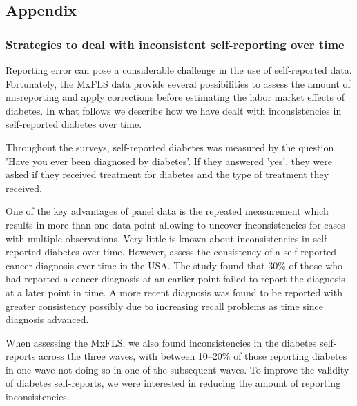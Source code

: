 \documentclass[12pt,english]{article}
\providecommand{\DIFaddbegin}{} %
\providecommand{\DIFaddend}{} %
\providecommand{\DIFdelend}{} %
\begin{document}
\DIFdelend \clearpage
\DIFaddbegin \begin{appendix}
\DIFaddend 



\part*{\label{part:Appendix}Appendix}

\section{\label{sec:Appendix}Strategies to deal with inconsistent self-reporting over time}

Reporting error can pose a considerable challenge in the use of self-reported data. Fortunately, the \ac{MxFLS} data provide several possibilities to assess the amount of misreporting and apply corrections before estimating the labor market effects of diabetes. In what follows we describe how we have dealt with inconsistencies in self-reported diabetes over time.

Throughout the surveys, self-reported diabetes was measured by the question 'Have you ever been diagnosed by diabetes'. If they answered 'yes', they were asked if they received treatment for diabetes and the type of treatment they received.

One of the key advantages of panel data is the repeated measurement which results in more than one data point allowing to uncover inconsistencies for cases with multiple observations. Very little is known about inconsistencies in self-reported diabetes over time. However, \textcite{Zajacova2010} assess the consistency of a self-reported cancer diagnosis over time in the USA. The study found that 30\% of those who had reported a cancer diagnosis at an earlier point failed to report the diagnosis at a later point in time. A more recent diagnosis was found to be reported with greater consistency possibly due to increasing recall problems as time since diagnosis advanced.

When assessing the \ac{MxFLS}, we also found inconsistencies in the diabetes self-reports across the three waves, with between 10--20\% of those reporting diabetes in one wave not doing so in one of the subsequent waves. To improve the validity of diabetes self-reports, we were interested in reducing the amount of reporting inconsistencies.


\end{appendix}
\end{document}

